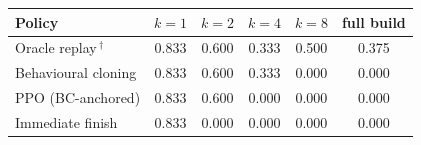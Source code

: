 \begin{tabular}{lccccc}
\toprule
Policy & $k{=}1$ & $k{=}2$ & $k{=}4$ & $k{=}8$ & full build \\
\midrule
Oracle replay\,$^\dagger$ & 0.833 & 0.600 & 0.333 & 0.500 & 0.375 \\
Behavioural cloning & 0.833 & 0.600 & 0.333 & 0.000 & 0.000 \\
PPO (BC-anchored) & 0.833 & 0.600 & 0.000 & 0.000 & 0.000 \\
Immediate finish & 0.833 & 0.000 & 0.000 & 0.000 & 0.000 \\
\bottomrule
\end{tabular}
